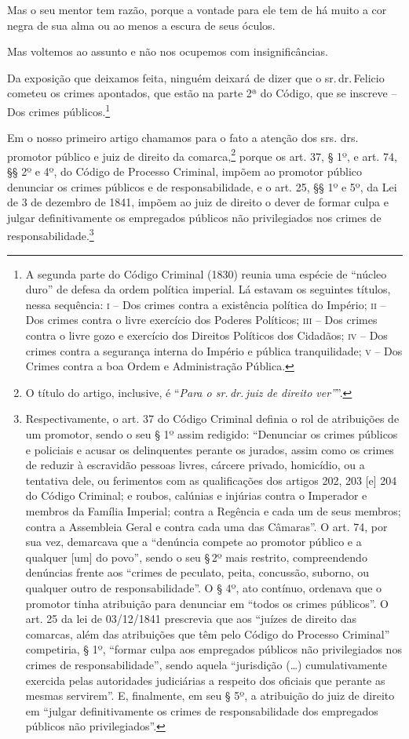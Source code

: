 Mas o seu mentor tem razão, porque a vontade para ele tem de há muito a
cor negra de sua alma ou ao menos a escura de seus óculos.

Mas voltemos ao assunto e não nos ocupemos com insignificâncias.

Da exposição que deixamos feita, ninguém deixará de dizer que o sr.\,dr.\,Felicio cometeu os crimes apontados, que estão na parte 2ª do Código,
que se inscreve -- Dos crimes públicos.\footnote{ A segunda parte do
  Código Criminal (1830) reunia uma espécie de ``núcleo duro'' de defesa
  da ordem política imperial. Lá estavam os seguintes títulos, nessa
  sequência: \textsc{i} -- Dos crimes contra a existência política do Império; \textsc{ii}
  -- Dos crimes contra o livre exercício dos Poderes Políticos; \textsc{iii} --
  Dos crimes contra o livre gozo e exercício dos Direitos Políticos dos
  Cidadãos; \textsc{iv} -- Dos crimes contra a segurança interna do Império e
  pública tranquilidade; \textsc{v} -- Dos Crimes contra a boa Ordem e
  Administração Pública.}

Em o nosso primeiro artigo chamamos para o fato a atenção dos srs. drs.
promotor público e juiz de direito da comarca,\footnote{ O título do
  artigo, inclusive, é ``\emph{Para o sr.\,dr.\,juiz de direito ver''}''.}
porque os art. 37, § 1º, e art. 74, §§ 2º e 4º, do Código de Processo
Criminal, impõem ao promotor público denunciar os crimes públicos e de
responsabilidade, e o art. 25, §§ 1º e 5º, da Lei de 3 de dezembro de
1841, impõem ao juiz de direito o dever de formar culpa e julgar
definitivamente os empregados públicos não privilegiados nos crimes de
responsabilidade.\footnote{ Respectivamente, o art. 37 do Código
  Criminal definia o rol de atribuições de um promotor, sendo o seu § 1º
  assim redigido: ``Denunciar os crimes públicos e policiais e acusar os
  delinquentes perante os jurados, assim como os crimes de reduzir à
  escravidão pessoas livres, cárcere privado, homicídio, ou a tentativa
  dele, ou ferimentos com as qualificações dos artigos 202, 203 {[}e{]}
  204 do Código Criminal; e roubos, calúnias e injúrias contra o
  Imperador e membros da Família Imperial; contra a Regência e cada um
  de seus membros; contra a Assembleia Geral e contra cada uma das
  Câmaras''. O art. 74, por sua vez, demarcava que a ``denúncia compete ao
  promotor público e a qualquer {[}um{]} do povo'', sendo o seu §\,2º mais
  restrito, compreendendo denúncias frente aos ``crimes de peculato,
  peita, concussão, suborno, ou qualquer outro de responsabilidade''. O §
  4º, ato contínuo, ordenava que o promotor tinha atribuição para
  denunciar em ``todos os crimes públicos''. O art. 25 da lei de
  03/12/1841 prescrevia que aos ``juízes de direito das comarcas, além
  das atribuições que têm pelo Código do Processo Criminal'' competiria,
  § 1º, ``formar culpa aos empregados públicos não privilegiados nos
  crimes de responsabilidade'', sendo aquela ``jurisdição (\ldots{})
  cumulativamente exercida pelas autoridades judiciárias a respeito dos
  oficiais que perante as mesmas servirem''. E, finalmente, em seu § 5º,
  a atribuição do juiz de direito em ``julgar definitivamente os crimes
  de responsabilidade dos empregados públicos não privilegiados''.}

